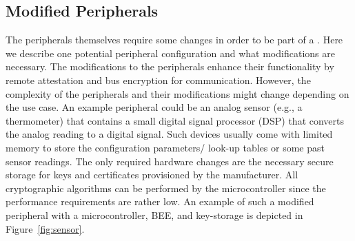  \subsection{Modified Peripherals}


 The peripherals themselves require some changes in order to be part of a \nameenclave. Here we describe one potential peripheral configuration and what modifications are necessary. The modifications to the peripherals enhance their functionality by remote attestation and bus encryption for communication. However, the complexity of the peripherals and their modifications might change depending on the use case. An example peripheral could be an analog sensor (e.g., a thermometer) that contains a small digital signal processor (DSP) that converts the analog reading to a digital signal.  Such devices usually come with limited memory to store the configuration parameters/ look-up tables or some past sensor readings. The only required hardware changes are the necessary secure storage for keys and certificates provisioned by the manufacturer. All cryptographic algorithms can be performed by the microcontroller since the performance requirements are rather low. An example of such a modified peripheral with a microcontroller, BEE, and key-storage is depicted in Figure~\ref{fig:sensor}.